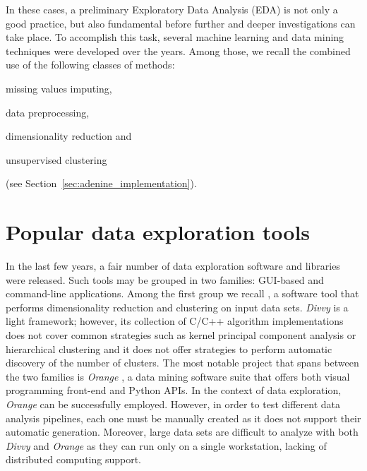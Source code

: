 In these cases, a preliminary Exploratory Data Analysis (EDA) is not only a good practice, but also fundamental before further and deeper investigations can take place.
To accomplish this task, several machine learning and data mining techniques were developed over the years.
Among those, we recall the combined use of the following classes of methods: \begin{enumerate*}[label=(\roman*)]
  \item missing values imputing,
  \item data preprocessing,
  \item dimensionality reduction and
  \item unsupervised clustering
\end{enumerate*} (see Section~\ref{sec:adenine_implementation}).


\section{Popular data exploration tools} \label{sec:data_exploration_tools}

In the last few years, a fair number of data exploration software and libraries were released. Such tools may be grouped in two families: GUI-based and command-line applications.
Among the first group we recall  \cite{lewis2013divvy}, a software tool that performs dimensionality reduction and clustering on input data sets. \emph{Divvy} is a light framework; however,
its collection of {C/C++} algorithm implementations does not cover common strategies such as kernel principal component analysis \cite{scholkopf1997kernel} or hierarchical clustering \cite{friedman2001elements} and it does not offer strategies to perform automatic discovery of the number of clusters.
The most notable project that spans between the two families is \emph{Orange} \cite{demvsar2013orange}, a data mining software suite that offers both visual programming front-end and Python APIs. In the context of data exploration, \emph{Orange} can be successfully employed. However, in order to test different data analysis pipelines, each one must be manually created as it does not support their automatic generation.
Moreover, large data sets are difficult to analyze with both \emph{Divvy} and \emph{Orange} as they can run only on a single workstation, lacking of distributed computing support.


